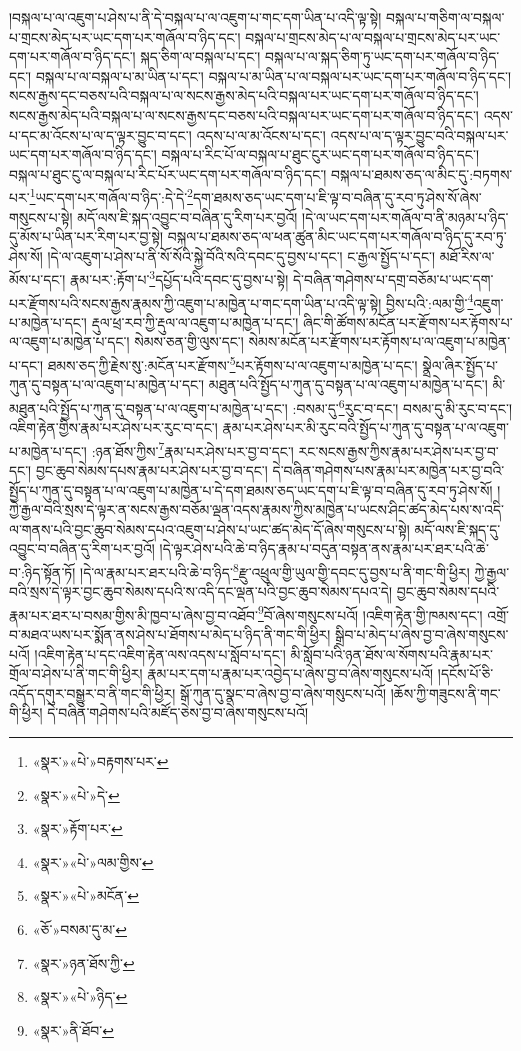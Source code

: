 །བསྐལ་པ་ལ་འཇུག་པ་ཤེས་པ་ནི་དེ་བསྐལ་པ་ལ་འཇུག་པ་གང་དག་ཡིན་པ་འདི་ལྟ་སྟེ། བསྐལ་པ་གཅིག་ལ་བསྐལ་པ་གྲངས་མེད་པར་ཡང་དག་པར་གཞོལ་བ་ཉིད་དང་། བསྐལ་པ་གྲངས་མེད་པ་ལ་བསྐལ་པ་གྲངས་མེད་པར་ཡང་དག་པར་གཞོལ་བ་ཉིད་དང་། སྐད་ཅིག་ལ་བསྐལ་པ་དང་། བསྐལ་པ་ལ་སྐད་ཅིག་ཏུ་ཡང་དག་པར་གཞོལ་བ་ཉིད་དང་། བསྐལ་པ་ལ་བསྐལ་པ་མ་ཡིན་པ་དང་། བསྐལ་པ་མ་ཡིན་པ་ལ་བསྐལ་པར་ཡང་དག་པར་གཞོལ་བ་ཉིད་དང་། སངས་རྒྱས་དང་བཅས་པའི་བསྐལ་པ་ལ་སངས་རྒྱས་མེད་པའི་བསྐལ་པར་ཡང་དག་པར་གཞོལ་བ་ཉིད་དང་། སངས་རྒྱས་མེད་པའི་བསྐལ་པ་ལ་སངས་རྒྱས་དང་བཅས་པའི་བསྐལ་པར་ཡང་དག་པར་གཞོལ་བ་ཉིད་དང་། འདས་པ་དང་མ་འོངས་པ་ལ་ད་ལྟར་བྱུང་བ་དང་། འདས་པ་ལ་མ་འོངས་པ་དང་། འདས་པ་ལ་ད་ལྟར་བྱུང་བའི་བསྐལ་པར་ཡང་དག་པར་གཞོལ་བ་ཉིད་དང་། བསྐལ་པ་རིང་པོ་ལ་བསྐལ་པ་ཐུང་ངུར་ཡང་དག་པར་གཞོལ་བ་ཉིད་དང་། བསྐལ་པ་ཐུང་ངུ་ལ་བསྐལ་པ་རིང་པོར་ཡང་དག་པར་གཞོལ་བ་ཉིད་དང་། བསྐལ་པ་ཐམས་ཅད་ལ་མིང་དུ་:བཏགས་པར་\footnote{«སྣར་»«པེ་»བརྟགས་པར་}ཡང་དག་པར་གཞོལ་བ་ཉིད་:དེ་དེ་\footnote{«སྣར་»«པེ་»དེ་}དག་ཐམས་ཅད་ཡང་དག་པ་ཇི་ལྟ་བ་བཞིན་དུ་རབ་ཏུ་ཤེས་སོ་ཞེས་གསུངས་པ་སྟེ། མདོ་ལས་ཇི་སྐད་འབྱུང་བ་བཞིན་དུ་རིག་པར་བྱའོ། །དེ་ལ་ཡང་དག་པར་གཞོལ་བ་ནི་མཉམ་པ་ཉིད་དུ་མོས་པ་ཡིན་པར་རིག་པར་བྱ་སྟེ། བསྐལ་པ་ཐམས་ཅད་ལ་ཕན་ཚུན་མིང་ཡང་དག་པར་གཞོལ་བ་ཉིད་དུ་རབ་ཏུ་ཤེས་སོ། །དེ་ལ་འཇུག་པ་ཤེས་པ་ནི་སོ་སོའི་སྐྱེ་བོའི་སའི་དབང་དུ་བྱས་པ་དང་། ང་རྒྱལ་སྤྱོད་པ་དང་། མཐོ་རིས་ལ་མོས་པ་དང་། རྣམ་པར་:རྟོག་པ་\footnote{«སྣར་»རྟོག་པར་}དཔྱོད་པའི་དབང་དུ་བྱས་པ་སྟེ། དེ་བཞིན་གཤེགས་པ་དགྲ་བཅོམ་པ་ཡང་དག་པར་རྫོགས་པའི་སངས་རྒྱས་རྣམས་ཀྱི་འཇུག་པ་མཁྱེན་པ་གང་དག་ཡིན་པ་འདི་ལྟ་སྟེ། བྱིས་པའི་:ལམ་གྱི་\footnote{«སྣར་»«པེ་»ལམ་གྱིས་}འཇུག་པ་མཁྱེན་པ་དང་། རྡུལ་ཕྲ་རབ་ཀྱི་རྡུལ་ལ་འཇུག་པ་མཁྱེན་པ་དང་། ཞིང་གི་ཚོགས་མངོན་པར་རྫོགས་པར་རྟོགས་པ་ལ་འཇུག་པ་མཁྱེན་པ་དང་། སེམས་ཅན་གྱི་ལུས་དང་། སེམས་མངོན་པར་རྫོགས་པར་རྟོགས་པ་ལ་འཇུག་པ་མཁྱེན་པ་དང་། ཐམས་ཅད་ཀྱི་རྗེས་སུ་:མངོན་པར་རྫོགས་\footnote{«སྣར་»«པེ་»མངོན་}པར་རྟོགས་པ་ལ་འཇུག་པ་མཁྱེན་པ་དང་། སྣྲེལ་ཞིར་སྤྱོད་པ་ཀུན་དུ་བསྟན་པ་ལ་འཇུག་པ་མཁྱེན་པ་དང་། མཐུན་པའི་སྤྱོད་པ་ཀུན་དུ་བསྟན་པ་ལ་འཇུག་པ་མཁྱེན་པ་དང་། མི་མཐུན་པའི་སྤྱོད་པ་ཀུན་དུ་བསྟན་པ་ལ་འཇུག་པ་མཁྱེན་པ་དང་། :བསམ་དུ་\footnote{«ཅོ་»བསམ་དུ་མ་}རུང་བ་དང་། བསམ་དུ་མི་རུང་བ་དང་། འཇིག་རྟེན་གྱིས་རྣམ་པར་ཤེས་པར་རུང་བ་དང་། རྣམ་པར་ཤེས་པར་མི་རུང་བའི་སྤྱོད་པ་ཀུན་དུ་བསྟན་པ་ལ་འཇུག་པ་མཁྱེན་པ་དང་། :ཉན་ཐོས་ཀྱིས་\footnote{«སྣར་»ཉན་ཐོས་ཀྱི་}རྣམ་པར་ཤེས་པར་བྱ་བ་དང་། རང་སངས་རྒྱས་ཀྱིས་རྣམ་པར་ཤེས་པར་བྱ་བ་དང་། བྱང་ཆུབ་སེམས་དཔས་རྣམ་པར་ཤེས་པར་བྱ་བ་དང་། དེ་བཞིན་གཤེགས་པས་རྣམ་པར་མཁྱེན་པར་བྱ་བའི་སྤྱོད་པ་ཀུན་དུ་བསྟན་པ་ལ་འཇུག་པ་མཁྱེན་པ་དེ་དག་ཐམས་ཅད་ཡང་དག་པ་ཇི་ལྟ་བ་བཞིན་དུ་རབ་ཏུ་ཤེས་སོ། །ཀྱེ་རྒྱལ་བའི་སྲས་དེ་ལྟར་ན་སངས་རྒྱས་བཅོམ་ལྡན་འདས་རྣམས་ཀྱིས་མཁྱེན་པ་ཡངས་ཤིང་ཚད་མེད་པས་ས་འདི་ལ་གནས་པའི་བྱང་ཆུབ་སེམས་དཔའ་འཇུག་པ་ཤེས་པ་ཡང་ཚད་མེད་དོ་ཞེས་གསུངས་པ་སྟེ། མདོ་ལས་ཇི་སྐད་དུ་འབྱུང་བ་བཞིན་དུ་རིག་པར་བྱའོ། །དེ་ལྟར་ཤེས་པའི་ཆེ་བ་ཉིད་རྣམ་པ་བདུན་བསྟན་ནས་རྣམ་པར་ཐར་པའི་ཆེ་བ་:ཉིད་སྟོན་ཏོ། །དེ་ལ་རྣམ་པར་ཐར་པའི་ཆེ་བ་ཉིད་\footnote{«སྣར་»«པེ་»ཉིད་}རྫུ་འཕྲུལ་གྱི་ཡུལ་གྱི་དབང་དུ་བྱས་པ་ནི་གང་གི་ཕྱིར། ཀྱེ་རྒྱལ་བའི་སྲས་དེ་ལྟར་བྱང་ཆུབ་སེམས་དཔའི་ས་འདི་དང་ལྡན་པའི་བྱང་ཆུབ་སེམས་དཔའ་དེ། བྱང་ཆུབ་སེམས་དཔའི་རྣམ་པར་ཐར་པ་བསམ་གྱིས་མི་ཁྱབ་པ་ཞེས་བྱ་བ་འཐོབ་\footnote{«སྣར་»ནི་ཐོབ་}བོ་ཞེས་གསུངས་པའོ། །འཇིག་རྟེན་གྱི་ཁམས་དང་། འགྲོ་བ་མཐའ་ཡས་པར་སྨོན་ནས་ཤེས་པ་ཐོགས་པ་མེད་པ་ཉིད་ནི་གང་གི་ཕྱིར། སྒྲིབ་པ་མེད་པ་ཞེས་བྱ་བ་ཞེས་གསུངས་པའོ། །འཇིག་རྟེན་པ་དང་འཇིག་རྟེན་ལས་འདས་པ་སློབ་པ་དང་། མི་སློབ་པའི་ཉན་ཐོས་ལ་སོགས་པའི་རྣམ་པར་གྲོལ་བ་ཤེས་པ་ནི་གང་གི་ཕྱིར། རྣམ་པར་དག་པ་རྣམ་པར་འབྱེད་པ་ཞེས་བྱ་བ་ཞེས་གསུངས་པའོ། །དངོས་པོ་ཅི་འདོད་དགུར་བསྒྱུར་བ་ནི་གང་གི་ཕྱིར། སྒོ་ཀུན་དུ་སྣང་བ་ཞེས་བྱ་བ་ཞེས་གསུངས་པའོ། །ཆོས་ཀྱི་གཟུངས་ནི་གང་གི་ཕྱིར། དེ་བཞིན་གཤེགས་པའི་མཛོད་ཅེས་བྱ་བ་ཞེས་གསུངས་པའོ། 